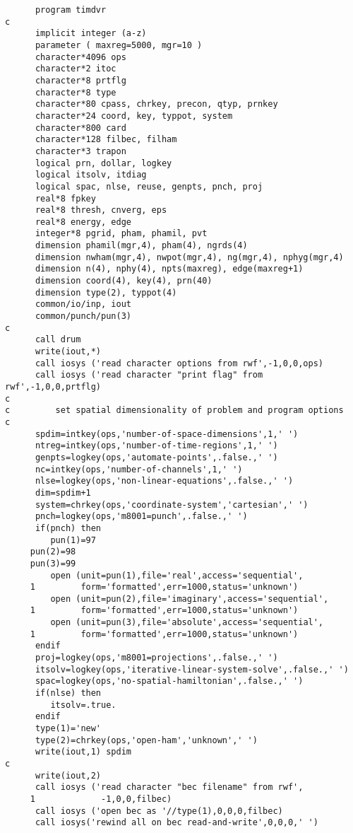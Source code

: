 \documentclass{article}
\begin{document}
\begin{verbatim}
      program timdvr
c
      implicit integer (a-z)
      parameter ( maxreg=5000, mgr=10 )
      character*4096 ops
      character*2 itoc
      character*8 prtflg
      character*8 type
      character*80 cpass, chrkey, precon, qtyp, prnkey
      character*24 coord, key, typpot, system
      character*800 card
      character*128 filbec, filham
      character*3 trapon
      logical prn, dollar, logkey
      logical itsolv, itdiag
      logical spac, nlse, reuse, genpts, pnch, proj
      real*8 fpkey 
      real*8 thresh, cnverg, eps
      real*8 energy, edge 
      integer*8 pgrid, pham, phamil, pvt
      dimension phamil(mgr,4), pham(4), ngrds(4)
      dimension nwham(mgr,4), nwpot(mgr,4), ng(mgr,4), nphyg(mgr,4)
      dimension n(4), nphy(4), npts(maxreg), edge(maxreg+1)
      dimension coord(4), key(4), prn(40)
      dimension type(2), typpot(4)
      common/io/inp, iout      
      common/punch/pun(3)
c
      call drum
      write(iout,*)
      call iosys ('read character options from rwf',-1,0,0,ops)
      call iosys ('read character "print flag" from rwf',-1,0,0,prtflg)
c
c         set spatial dimensionality of problem and program options 
c
      spdim=intkey(ops,'number-of-space-dimensions',1,' ')
      ntreg=intkey(ops,'number-of-time-regions',1,' ') 
      genpts=logkey(ops,'automate-points',.false.,' ')
      nc=intkey(ops,'number-of-channels',1,' ') 
      nlse=logkey(ops,'non-linear-equations',.false.,' ')
      dim=spdim+1
      system=chrkey(ops,'coordinate-system','cartesian',' ')
      pnch=logkey(ops,'m8001=punch',.false.,' ')
      if(pnch) then
         pun(1)=97
	 pun(2)=98
	 pun(3)=99
         open (unit=pun(1),file='real',access='sequential',
     1         form='formatted',err=1000,status='unknown')
         open (unit=pun(2),file='imaginary',access='sequential',
     1         form='formatted',err=1000,status='unknown')
         open (unit=pun(3),file='absolute',access='sequential',
     1         form='formatted',err=1000,status='unknown')
      endif    	 
      proj=logkey(ops,'m8001=projections',.false.,' ')
      itsolv=logkey(ops,'iterative-linear-system-solve',.false.,' ')
      spac=logkey(ops,'no-spatial-hamiltonian',.false.,' ')
      if(nlse) then
         itsolv=.true.
      endif
      type(1)='new'
      type(2)=chrkey(ops,'open-ham','unknown',' ')
      write(iout,1) spdim
c
      write(iout,2)
      call iosys ('read character "bec filename" from rwf',
     1             -1,0,0,filbec)
      call iosys ('open bec as '//type(1),0,0,0,filbec)
      call iosys('rewind all on bec read-and-write',0,0,0,' ')

\end{verbatim}
\end{document}

